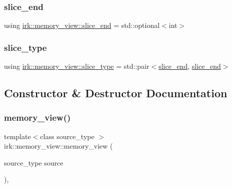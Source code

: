 \subsubsection{\texorpdfstring{slice\+\_\+end}{slice\_end}}
{\footnotesize\ttfamily using \mbox{\hyperlink{classirk_1_1memory__view_a061864050dba61b052062ec459822885}{irk\+::memory\+\_\+view\+::slice\+\_\+end}} =  std\+::optional$<$int$>$}

\mbox{\label{classirk_1_1memory__view_ac0c1d9600bf81e8cb861a89ab104a43c}} 
\subsubsection{\texorpdfstring{slice\+\_\+type}{slice\_type}}
{\footnotesize\ttfamily using \mbox{\hyperlink{classirk_1_1memory__view_ac0c1d9600bf81e8cb861a89ab104a43c}{irk\+::memory\+\_\+view\+::slice\+\_\+type}} =  std\+::pair$<$\mbox{\hyperlink{classirk_1_1memory__view_a061864050dba61b052062ec459822885}{slice\+\_\+end}}, \mbox{\hyperlink{classirk_1_1memory__view_a061864050dba61b052062ec459822885}{slice\+\_\+end}}$>$}



\subsection{Constructor \& Destructor Documentation}
\mbox{\label{classirk_1_1memory__view_a25918933f1b7944199c65654517d2a72}} 
\subsubsection{\texorpdfstring{memory\+\_\+view()}{memory\_view()}\hspace{0.1cm}{\footnotesize\ttfamily [1/2]}}
{\footnotesize\ttfamily template$<$class source\+\_\+type $>$ \\
irk\+::memory\+\_\+view\+::memory\+\_\+view (\begin{DoxyParamCaption}\item[{source\+\_\+type}]{source }\end{DoxyParamCaption})\hspace{0.3cm}{\ttfamily [inline]}, {\ttfamily [explicit]}}



